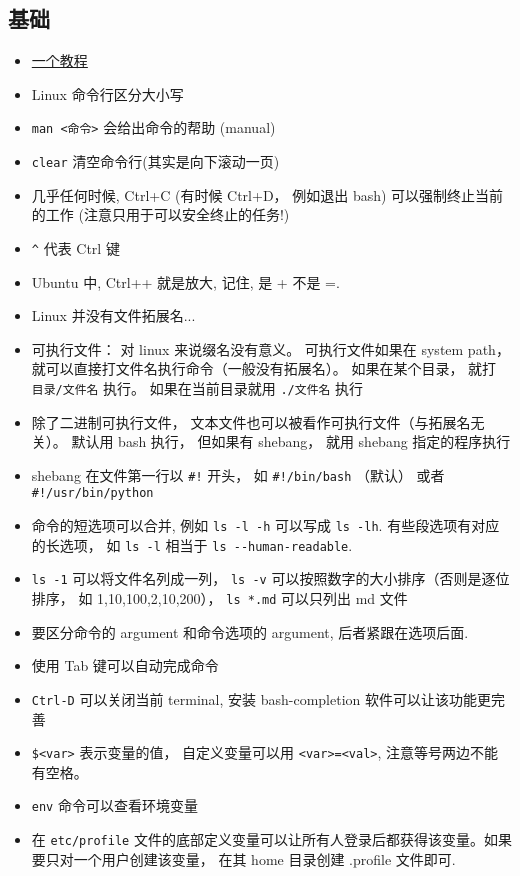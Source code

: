 
\subsection{基础}
\begin{itemize}
\item \href{http://faculty.salina.k-state.edu/tim/unix_sg/index.html}{一个教程}
\item Linux 命令行区分大小写
\item \verb`man <命令>`  会给出命令的帮助 (manual)
\item \verb`clear` 清空命令行(其实是向下滚动一页)
\item 几乎任何时候, Ctrl+C (有时候 Ctrl+D， 例如退出 bash) 可以强制终止当前的工作 (注意只用于可以安全终止的任务!)
\item \verb`^` 代表 Ctrl 键
\item Ubuntu 中, Ctrl++ 就是放大, 记住, 是 + 不是 =.
\item Linux 并没有文件拓展名...
\item 可执行文件： 对 linux 来说缀名没有意义。 可执行文件如果在 system path， 就可以直接打文件名执行命令（一般没有拓展名）。 如果在某个目录， 就打 \verb`目录/文件名` 执行。 如果在当前目录就用 \verb`./文件名` 执行
\item 除了二进制可执行文件， 文本文件也可以被看作可执行文件（与拓展名无关）。 默认用 bash 执行， 但如果有 shebang， 就用 shebang 指定的程序执行
\item shebang 在文件第一行以 \verb`#!` 开头， 如 \verb`#!/bin/bash` （默认） 或者 \verb`#!/usr/bin/python`
\item 命令的短选项可以合并, 例如 \verb`ls -l -h` 可以写成 \verb`ls -lh`. 有些段选项有对应的长选项， 如 \verb`ls -l` 相当于 \verb`ls --human-readable`.
\item \verb`ls -1` 可以将文件名列成一列， \verb`ls -v` 可以按照数字的大小排序（否则是逐位排序， 如 1,10,100,2,10,200）， \verb`ls *.md` 可以只列出 md 文件
\item 要区分命令的 argument 和命令选项的 argument, 后者紧跟在选项后面.
\item 使用 Tab 键可以自动完成命令
\item \verb`Ctrl-D` 可以关闭当前 terminal, 安装 bash-completion 软件可以让该功能更完善
\item \verb`$<var>` 表示变量的值， 自定义变量可以用 \verb`<var>=<val>`, 注意等号两边不能有空格。
\item \verb`env` 命令可以查看环境变量
\item 在 \verb`etc/profile` 文件的底部定义变量可以让所有人登录后都获得该变量。如果要只对一个用户创建该变量， 在其 home 目录创建 .profile 文件即可.

\end{itemize}
